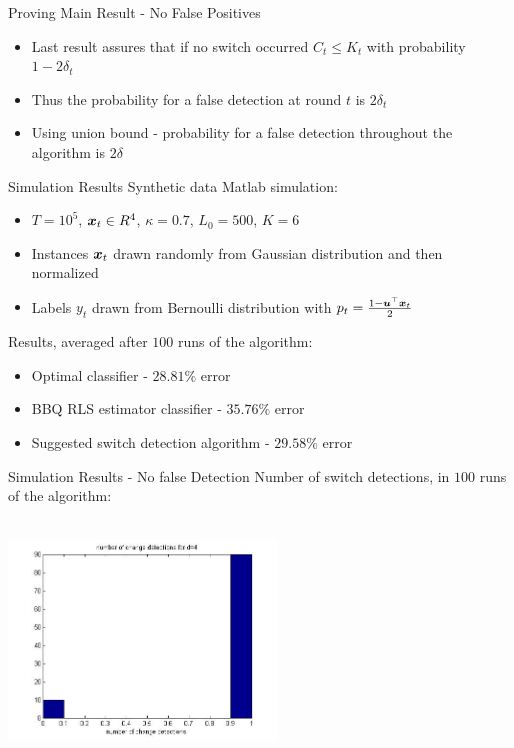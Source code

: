\documentclass{beamer}
\begin{document}
\begin{frame}{Proving Main Result - No False Positives}
\begin{itemize}
\item Last result assures that if no switch occurred $C_t\leq K_t$ with probability $1-2\delta_t$\newline
\item Thus  the probability for a false detection at round $t$ is $2\delta_t$\newline
\item Using union bound - probability for a false detection throughout the algorithm is $2\delta$\newline


\end{itemize}
\end{frame}

\begin{frame}{Simulation Results}
Synthetic data Matlab simulation:\newline
\begin{itemize}
\item $T=10^5$, ${\boldsymbol{x}}_{t}\in R^4$, $\kappa=0.7$, $L_0=500$, $K=6$
\item Instances ${\boldsymbol{x}}_{t}$ drawn randomly from Gaussian distribution and then normalized
\item Labels $y_t$ drawn from Bernoulli distribution with $p_t=\frac{1-{{\boldsymbol{u}}}^{\top}{\boldsymbol{x}}_{t}}{2}$\newline
\end{itemize}
Results, averaged after $100$ runs of the algorithm:\newline
\begin{itemize}
\item Optimal classifier - $28.81\%$ error
\item BBQ RLS estimator classifier - $35.76\%$ error
\item Suggested switch detection algorithm - $29.58\%$ error
\end{itemize}
\end{frame}

\begin{frame}{Simulation Results - No false Detection}
Number of switch detections, in $100$ runs of the algorithm:
\begin{center}
\includegraphics[height=2.5in,width=2.8in]{Ndet_clas.jpg}
\end{center}
\end{frame}
\end{document}
